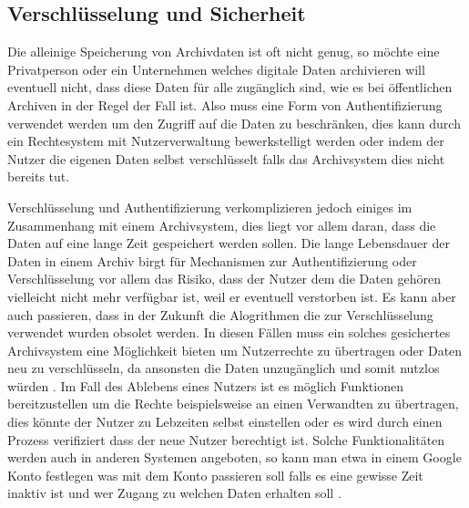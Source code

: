 \documentclass[conference,compsoc,final,a4paper]{IEEEtran}
\begin{document}
\subsection{Verschlüsselung und Sicherheit}
Die alleinige Speicherung von Archivdaten ist oft nicht genug, so möchte eine Privatperson oder ein Unternehmen welches digitale Daten archivieren will eventuell nicht, dass diese Daten für alle zugänglich sind, wie es bei öffentlichen Archiven in der Regel der Fall ist. Also muss eine Form von Authentifizierung verwendet werden um den Zugriff auf die Daten zu beschränken, dies kann durch ein Rechtesystem mit Nutzerverwaltung bewerkstelligt werden oder indem der Nutzer die eigenen Daten selbst verschlüsselt falls das Archivsystem dies nicht bereits tut.

Verschlüsselung und Authentifizierung verkomplizieren jedoch einiges im Zusammenhang mit einem Archivsystem, dies liegt vor allem daran, dass die Daten auf eine lange Zeit gespeichert werden sollen. Die lange Lebensdauer der Daten in einem Archiv birgt für Mechanismen zur Authentifizierung oder Verschlüsselung vor allem das Risiko, dass der Nutzer dem die Daten gehören vielleicht nicht mehr verfügbar ist, weil er eventuell verstorben ist. Es kann aber auch passieren, dass in der Zukunft die Alogrithmen die zur Verschlüsselung verwendet wurden obsolet werden. In diesen Fällen muss ein solches gesichertes Archivsystem eine Möglichkeit bieten um Nutzerrechte zu übertragen oder Daten neu zu verschlüsseln, da ansonsten die Daten unzugänglich und somit nutzlos würden \autocite{Storer2006}. Im Fall des Ablebens eines Nutzers ist es möglich Funktionen bereitzustellen um die Rechte beispielsweise an einen Verwandten zu übertragen, dies könnte der Nutzer zu Lebzeiten selbst einstellen oder es wird durch einen Prozess verifiziert dass der neue Nutzer berechtigt ist. Solche Funktionalitäten werden auch in anderen Systemen angeboten, so kann man etwa in einem Google Konto festlegen was mit dem Konto passieren soll falls es eine gewisse Zeit inaktiv ist und wer Zugang zu welchen Daten erhalten soll \autocite{GoogleKontoaktivität}.
\end{document}
